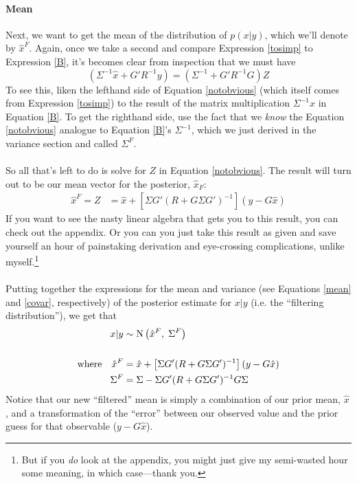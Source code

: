 \documentclass[a4paper,12pt]{article}
\begin{document}
\paragraph{Mean} 
Next, we want to get the {mean} of the distribution of 
$p(x|y)$, which we'll denote by $\hat{x}^F$.  Again, once we
take a second and compare Expression \ref{tosimp}
to Expression \ref{B}, it's becomes clear from inspection 
that we must have 
\begin{equation}
    \label{notobvious}
    (\Sigma^{-1} \hat{x} + G'R^{-1}y) 
	= \left( \Sigma^{-1} + G'R^{-1}G\right) Z
\end{equation}
To see this, 
liken the lefthand side of Equation \ref{notobvious} (which 
itself comes from Expression \ref{tosimp}) to
the result of the matrix multiplication $\Sigma^{-1}\hat{x}$ in
Equation \ref{B}. To get the righthand side, use the fact
that we \emph{know} the Equation \ref{notobvious} analogue
to Equation \ref{B}'s $\Sigma^{-1}$, which we just 
derived in the variance section and called $\Sigma^F$.
\\
\\
So all that's left to do is solve for $Z$ in Equation
\ref{notobvious}.  The result will turn out to be our mean
vector for the posterior, $\hat{x}_F$:
\begin{align}
    \label{mean}
    \hat{x}^F = Z 
        &= \hat{x} 
        + \left[\Sigma G' (R + G \Sigma G')^{-1}  \right]
        \left( y - G \hat{x} \right)  
\end{align}
If you want to see the nasty linear algebra that gets you
to this result, you can check out the appendix. Or you can 
you just take this result as given and save yourself an
hour of painstaking derivation and eye-crossing complications,
unlike myself.\footnote{But if you \emph{do} look at the appendix,
you might just give my semi-wasted hour some meaning, in which 
case---thank you.}
\\
\\
Putting together the expressions for the mean and variance
(see Equations \ref{mean} and \ref{covar}, respectively)
of the posterior estimate for $x|y$ (i.e. the ``filtering
distribution''), we get that
\begin{align}
    x | y &\sim \text{N} \left(\hat{x}^F, \; \Sigma^F\right) 
    \label{filtered} \\
    \notag\\
    \text{where} \quad \hat{x}^F &= \hat{x} 
	+ \left[\Sigma G' (R + G \Sigma G')^{-1}  \right]
	\left( y - G \hat{x} \right)  \notag \\
    \Sigma^F &= \Sigma - \Sigma G'(R 
	    + G\Sigma G')^{-1}
	    G\Sigma \notag
\end{align}
Notice that our new ``filtered'' mean is simply a 
combination of our prior mean, $\hat{x}$, and 
a transformation of the ``error'' between our
observed value and the prior guess for that
observable ($y - G\hat{x}$).
\end{document}
